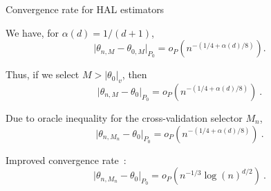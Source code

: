 \documentclass{beamer}
\begin{document}
\begin{frame}{Convergence rate for HAL estimators}
\vspace{0.25cm}

We have, for $\alpha(d)=1/(d+1)$,
\[
  \lvert \theta_{n,M} - \theta_{0,M} \rvert_{P_0}=o_P(n^{-(1/4+\alpha(d)/8)}).
\]

Thus, if we select $M> \lvert \theta_0 \rvert_v$, then
\[
  \lvert \theta_{n,M} - \theta_{0} \rvert_{P_0} =
  o_P(n^{-(1/4+\alpha(d)/8)})\ .
\]

Due to oracle inequality for the cross-validation selector $M_n$,
\[
  \lvert \theta_{n,M_n} - \theta_{0} \rvert_{P_0} =
  o_P(n^{-(1/4+\alpha(d)/8)}) \ .
\]

Improved convergence rate~\citep{bibaut2019fast}:
\[
  \lvert \theta_{n,M_n} - \theta_{0} \rvert_{P_0} =
  o_P(n^{-1/3} \log(n)^{d/2}) \ .
\]


\end{frame}

\end{document}
